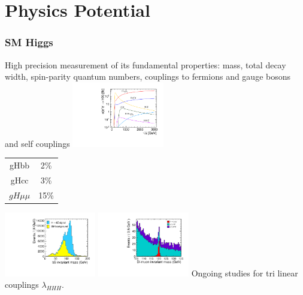 \documentclass{beamer}
\begin{document}
\section{Physics Potential}
\begin{frame}
\frametitle{SM Higgs}
High precision measurement of its fundamental properties: mass, total decay
width, spin-parity quantum numbers, couplings to fermions and gauge bosons and
self couplings
\includegraphics[width=4cm]{../SIDWorkshop/xsec_vs_cme.pdf}
\begin{tabular}{cc}
gHbb & 2\%\\
gHcc & 3\% \\
$gH\mu\mu$ & 15\%
\end{tabular}
\includegraphics[width=4cm]{../SIDWorkshop/ee_h_bb_mass_mh120GeV.pdf}
\includegraphics[width=4cm]{../SIDWorkshop/ee_h_mumu_mass_mh120GeV.pdf}
Ongoing studies for tri linear couplings $\lambda_{HHH}$.
\end{frame}
\end{document}
